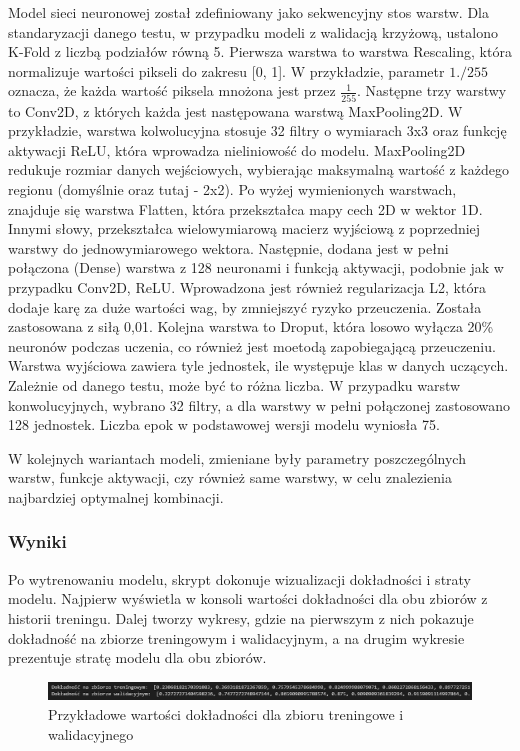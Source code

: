 Model sieci neuronowej został zdefiniowany jako sekwencyjny stos warstw.
Dla standaryzacji danego testu, w przypadku modeli z walidacją krzyżową, ustalono K-Fold z liczbą podziałów równą 5.
Pierwsza warstwa to warstwa Rescaling, która normalizuje wartości pikseli do zakresu [0, 1].
W przykładzie, parametr $1./255$ oznacza, że każda wartość piksela mnożona jest przez $\frac{1}{255}$.
Następne trzy warstwy to Conv2D, z których każda jest następowana warstwą MaxPooling2D.
W przykładzie, warstwa kolwolucyjna stosuje 32 filtry o wymiarach 3x3 oraz funkcję aktywacji ReLU,
która wprowadza nieliniowość do modelu.
MaxPooling2D redukuje rozmiar danych wejściowych,
wybierając maksymalną wartość z każdego regionu (domyślnie oraz tutaj - 2x2). 
Po wyżej wymienionych warstwach, znajduje się warstwa Flatten, która przekształca mapy cech 2D w wektor 1D.
Innymi słowy, przekształca wielowymiarową macierz wyjściową z poprzedniej warstwy do jednowymiarowego wektora.
Następnie, dodana jest w pełni połączona (Dense) warstwa z 128 neuronami
i funkcją aktywacji, podobnie jak w przypadku Conv2D, ReLU.
Wprowadzona jest również regularizacja L2, która dodaje karę za duże wartości wag,
by zmniejszyć ryzyko przeuczenia. Została zastosowana z siłą 0,01.
Kolejna warstwa to Droput, która losowo wyłącza 20\% neuronów podczas uczenia,
co również jest moetodą zapobiegającą przeuczeniu.
Warstwa wyjściowa zawiera tyle jednostek, ile występuje klas w danych uczących.
Zależnie od danego testu, może być to różna liczba.
W przypadku warstw konwolucyjnych, wybrano 32 filtry, a dla warstwy w pełni połączonej zastosowano 128 jednostek.
Liczba epok w podstawowej wersji modelu wyniosła 75.

W kolejnych wariantach modeli, zmieniane były parametry poszczególnych warstw, funkcje aktywacji,
czy również same warstwy, w celu znalezienia najbardziej optymalnej kombinacji.

\subsubsection{Wyniki}
Po wytrenowaniu modelu, skrypt dokonuje wizualizacji dokładności i straty modelu.
Najpierw wyświetla w konsoli wartości dokładności dla obu zbiorów z historii treningu.
Dalej tworzy wykresy, gdzie na pierwszym z nich pokazuje dokładność na zbiorze treningowym i walidacyjnym,
a na drugim wykresie prezentuje stratę modelu dla obu zbiorów.

\begin{figure}[ht]
	\centering
	\includegraphics[width=15cm]{resources/tests/images/scr-standard-result.png}
	\caption{Przykładowe wartości dokładności dla zbioru treningowe i walidacyjnego}
	\label{Fig:tests-wyniki-2}
\end{figure}
\FloatBarrier

